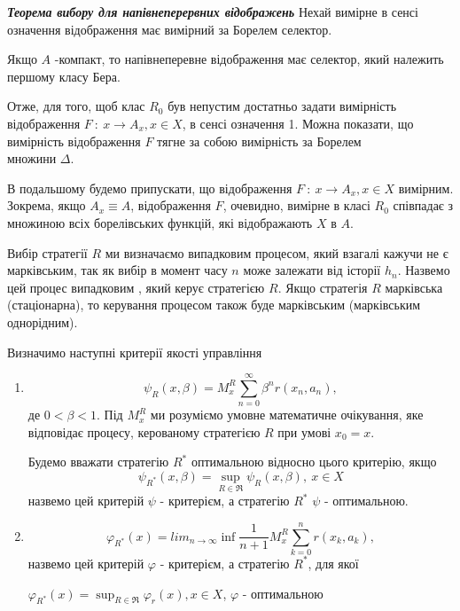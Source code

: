 \documentclass[a4paper, 14pt]{extarticle}
\begin{document}
\begin{center}
	\textbf{\textit{Теорема вибору для напівнеперервних відображень}}\newline
	Нехай вимірне в сенсі означення  відображення  має вимірний за Борелем селектор.	
\end{center}
Якщо $A$ -компакт, то напівнеперевне відображення має селектор, який належить першому класу Бера.\par
Отже, для того, щоб клас $R_0$ був непустим достатньо задати вимірність відображення $F \ : \ x \rightarrow A_x, x \in X$, в сенсі означення 1. Можна показати, що вимірність відображення $F$ тягне за собою  вимірність за Борелем \\ множини $\Delta$.\par
В подальшому будемо припускати, що відображення $F \ : \ x \rightarrow A_x, x \in X$ вимірним. Зокрема, якщо $A_x \equiv A$, відображення  $F$, очевидно, вимірне  в класі $R_0$ співпадає з множиною всіх борелівських функцій, які відображають $X$ в $A$. \par
Вибір стратегії $R$ ми визначаємо випадковим процесом, який взагалі кажучи не є марківським, так як вибір в момент часу $n$ може залежати від історії $h_n$. Назвемо цей процес випадковим , який керує стратегією $R$. Якщо стратегія $R$ марківська (стаціонарна), то керування процесом також буде марківським (марківським однорідним).\\


\begin{center}
Визначимо наступні критерії якості управління 
\end{center}

\begin{enumerate}
\item $$\psi_R(x,\beta) = M_x^R\sum_{n=0}^{\infty}\beta^nr(x_n,a_n),$$ де $0<\beta<1$. Під $M_x^R$ ми розуміємо умовне математичне очікування, яке відповідає процесу, керованому стратегією $R$ при умові $x_0 = x$.\par
Будемо вважати стратегію $R^*$ оптимальною відносно цього критерію, якщо $$ \psi_{R^*}(x,\beta) = \sup_{R \in \Re} \psi_R(x,\beta), \ x \in X$$\newline
назвемо цей критерій $\psi$ - критерієм, а стратегію $R^*$ $\psi$ - оптимальною.

\item $$\varphi_{R^*}(x) = lim_{n \rightarrow \infty} \inf \frac{1}{n+1}M_x^R\sum_{k=0}^nr(x_k,a_k),$$ назвемо цей критерій $\varphi$ - критерієм, а стратегію $R^*$, для якої \newline
	
 $\varphi_{R^*}(x) = \sup_{R \in \Re} \varphi_r(x), x \in X$, $\varphi$ - оптимальною
\end{enumerate}   
\end{document}
